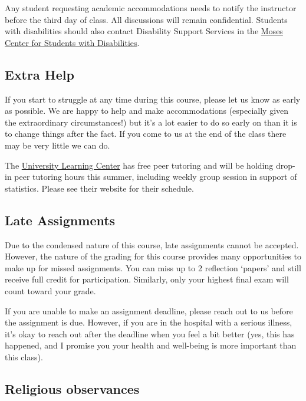 \documentclass[
]{book}
\begin{document}
Any student requesting academic accommodations needs to notify the instructor before the third day of class. All discussions will remain confidential. Students with disabilities should also contact Disability Support Services in the \href{https://www.nyu.edu/students/communities-and-groups/student-accessibility.html}{Moses Center for Students with Disabilities}.

\hypertarget{extra-help}{%
\subsection{Extra Help}\label{extra-help}}

If you start to struggle at any time during this course, please let us know as early as possible. We are happy to help and make accommodations (especially given the extraordinary circumstances!) but it's a lot easier to do so early on than it is to change things after the fact. If you come to us at the end of the class there may be very little we can do.

The \href{https://www.nyu.edu/students/academic-services/undergraduate-advisement/academic-resource-center/tutoring-and-learning.html}{University Learning Center} has free peer tutoring and will be holding drop-in peer tutoring hours this summer, including weekly group session in support of statistics. Please see their website for their schedule.

\hypertarget{late-assignments}{%
\subsection{Late Assignments}\label{late-assignments}}

Due to the condensed nature of this course, late assignments cannot be accepted. However, the nature of the grading for this course provides many opportunities to make up for missed assignments. You can miss up to 2 reflection `papers' and still receive full credit for participation. Similarly, only your highest final exam will count toward your grade.

If you are unable to make an assignment deadline, please reach out to us before the assignment is due. However, if you are in the hospital with a serious illness, it's okay to reach out after the deadline when you feel a bit better (yes, this has happened, and I promise you your health and well-being is more important than this class).

\hypertarget{religious-observances}{%
\subsection{Religious observances}\label{religious-observances}}
\end{document}
